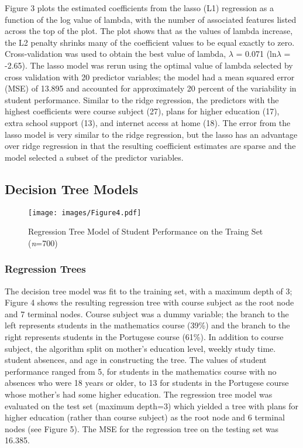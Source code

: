 \documentclass[sigconf]{acmart}
\begin{document}
Figure 3 plots the estimated coefficients from the lasso (L1) regression as 
a function of the log value of lambda, with the number of associated features 
listed across the top of the plot. The plot shows that as the values of lambda 
increase, the L2 penalty shrinks many of the coefficient values to be equal 
exactly to zero. Cross-validation was used to obtain the best value of lambda, 
$\lambda$ = 0.071 (ln$\lambda$ = -2.65). The lasso model was rerun using the 
optimal value of lambda selected by cross validation with 20 predictor 
variables; the model had a mean squared error (MSE) of 13.895 and accounted 
for approximately 20 percent of the variability in student performance. 
Similar to the ridge regression, the predictors with the highest coefficients 
were course subject (27), plans for higher education (17), extra school support 
(13), and internet access at home (18). The error from the lasso model is very 
similar to the ridge regression, but the lasso has an advantage over ridge 
regression in that the resulting coefficient estimates are sparse and the 
model selected a subset of the predictor variables. 


\subsection{Decision Tree Models}

\begin{figure}[!ht]
  \centering\texttt{[image: images/Figure4.pdf]}
  \caption{Regression Tree Model of Student Performance on the 
  Traing Set (\textit{n}=700)}
  \label{f:Figure4}
\end{figure}

\subsubsection{Regression Trees}

The decision tree model was fit to the training set, with a maximum depth of 3;
Figure 4 shows the resulting regression tree with course subject as the root 
node and 7 terminal nodes. Course subject was a dummy variable; the branch to 
the left represents students in the mathematics course (39\%) and the branch to 
the right represents students in the Portugese course (61\%). In addition to 
course subject, the algorithm split on mother's education level, weekly study 
time. student absences, and age in constructing the tree. The values of student 
performance ranged from 5, for students in the mathematics course with no 
absences who were 18 years or older, to 13 for students in the Portugese course 
whose mother's had some higher education. The regression tree model was evaluated 
on the test set (maximum depth=3) which yielded a tree with plans for higher 
education (rather than course subject) as the root node and 6 terminal nodes 
(see Figure 5). The MSE for the regression tree on the testing set was 16.385.
\end{document}

